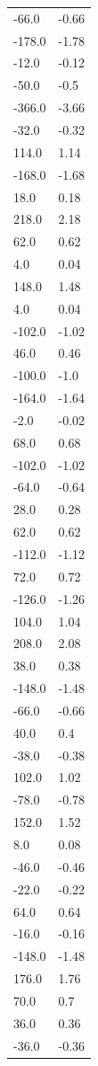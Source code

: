 \begin{longtable}{ll}
-66.0 & -0.66 \\
-178.0 & -1.78 \\
-12.0 & -0.12 \\
-50.0 & -0.5 \\
-366.0 & -3.66 \\
-32.0 & -0.32 \\
114.0 & 1.14 \\
-168.0 & -1.68 \\
18.0 & 0.18 \\
218.0 & 2.18 \\
62.0 & 0.62 \\
4.0 & 0.04 \\
148.0 & 1.48 \\
4.0 & 0.04 \\
-102.0 & -1.02 \\
46.0 & 0.46 \\
-100.0 & -1.0 \\
-164.0 & -1.64 \\
-2.0 & -0.02 \\
68.0 & 0.68 \\
-102.0 & -1.02 \\
-64.0 & -0.64 \\
28.0 & 0.28 \\
62.0 & 0.62 \\
-112.0 & -1.12 \\
72.0 & 0.72 \\
-126.0 & -1.26 \\
104.0 & 1.04 \\
208.0 & 2.08 \\
38.0 & 0.38 \\
-148.0 & -1.48 \\
-66.0 & -0.66 \\
40.0 & 0.4 \\
-38.0 & -0.38 \\
102.0 & 1.02 \\
-78.0 & -0.78 \\
152.0 & 1.52 \\
8.0 & 0.08 \\
-46.0 & -0.46 \\
-22.0 & -0.22 \\
64.0 & 0.64 \\
-16.0 & -0.16 \\
-148.0 & -1.48 \\
176.0 & 1.76 \\
70.0 & 0.7 \\
36.0 & 0.36 \\
-36.0 & -0.36 \\

\end{longtable}
